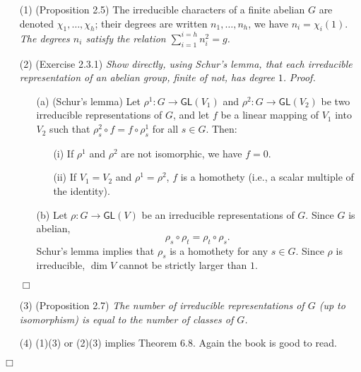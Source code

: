\documentclass{article}
\begin{document}
\begin{enumerate}
\item[(1)]
  (Proposition 2.5)
  The irreducible characters of a finite abelian $G$ are denoted
  $\chi_1, \ldots, \chi_h$;
  their degrees are written $n_1, \ldots, n_h$, we have $n_i = \chi_i(1)$.
  \emph{The degrees $n_i$ satisfy the relation $\sum_{i=1}^{i=h} n_i^2 = g$.}

\item[(2)]
  (Exercise 2.3.1)
  \emph{Show directly, using Schur's lemma,
  that each irreducible representation of an abelian group,
  finite of not, has degree $1$.}
  \emph{Proof.}
  \begin{enumerate}
  \item[(a)]
    (Schur's lemma)
    Let $\rho^1: G \to \mathsf{GL}(V_1)$ and $\rho^2: G \to \mathsf{GL}(V_2)$ be
    two irreducible representations of $G$,
    and let $f$ be a linear mapping of $V_1$ into $V_2$ such that
    $\rho^2_s \circ f = f \circ \rho^1_s$ for all $s \in G$. Then:
    \begin{enumerate}
    \item[(i)]
      If $\rho^1$ and $\rho^2$ are not isomorphic, we have $f = 0$.

    \item[(ii)]
      If $V_1 = V_2$ and $\rho^1 = \rho^2$, $f$ is a homothety (i.e., a scalar multiple of the identity).
    \end{enumerate}

  \item[(b)]
    Let $\rho: G \to \mathsf{GL}(V)$ be an irreducible representations of $G$.
    Since $G$ is abelian,
    \[
      \rho_s \circ \rho_t = \rho_t \circ \rho_s.
    \]
    Schur's lemma implies that $\rho_s$ is a homothety for any $s \in G$.
    Since $\rho$ is irreducible, $\dim V$ cannot be strictly larger than $1$.
  \end{enumerate}
  $\Box$

\item[(3)]
  (Proposition 2.7)
  \emph{The number of irreducible representations of $G$ (up to isomorphism)
  is equal to the number of classes of $G$.}

\item[(4)]
  (1)(3) or (2)(3) implies Theorem 6.8.
  Again the book is good to read.
\end{enumerate}
$\Box$ \\\\



\end{document}
